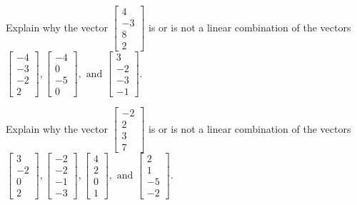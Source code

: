 \documentclass{article}
\begin{document}
\begin{exerciseStatement}
    Explain why the vector \(\left[\begin{array}{c}
4 \\
-3 \\
8 \\
2
\end{array}\right]\)  is or is not a linear
combination of the vectors \(\left[\begin{array}{c}
-4 \\
-3 \\
-2 \\
2
\end{array}\right] , \left[\begin{array}{c}
-4 \\
0 \\
-5 \\
0
\end{array}\right] , \text{ and } \left[\begin{array}{c}
3 \\
-2 \\
-3 \\
-1
\end{array}\right]\).



  
\end{exerciseStatement}

\begin{exerciseStatement}
    Explain why the vector \(\left[\begin{array}{c}
-2 \\
2 \\
3 \\
7
\end{array}\right]\)  is or is not a linear
combination of the vectors \(\left[\begin{array}{c}
3 \\
-2 \\
0 \\
2
\end{array}\right] , \left[\begin{array}{c}
-2 \\
-2 \\
-1 \\
-3
\end{array}\right] , \left[\begin{array}{c}
4 \\
2 \\
0 \\
1
\end{array}\right] , \text{ and } \left[\begin{array}{c}
2 \\
1 \\
-5 \\
-2
\end{array}\right]\).



  
\end{exerciseStatement}
\end{document}
